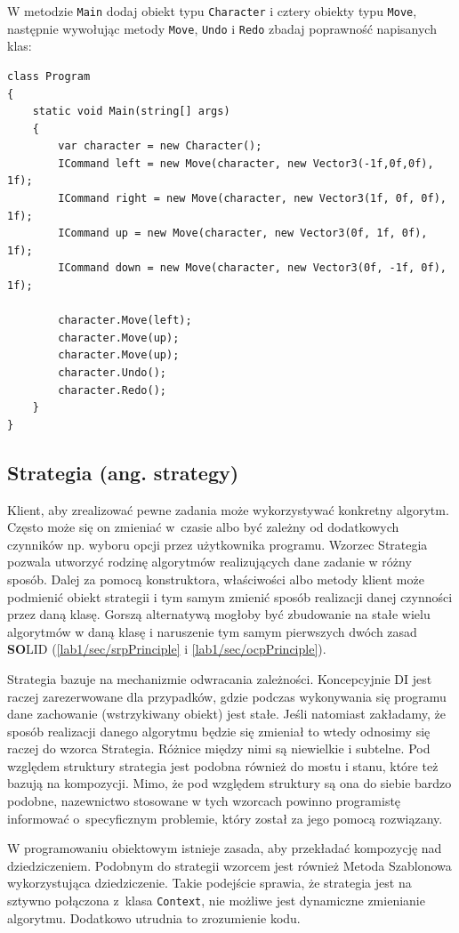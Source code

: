 W metodzie \texttt{Main} dodaj obiekt typu \texttt{Character} i cztery obiekty typu \texttt{Move}, następnie wywołując metody \texttt{Move}, \texttt{Undo} i \texttt{Redo} zbadaj poprawność napisanych klas:
\begin{lstlisting}
class Program
{
	static void Main(string[] args)
	{
		var character = new Character();
		ICommand left = new Move(character, new Vector3(-1f,0f,0f), 1f);
		ICommand right = new Move(character, new Vector3(1f, 0f, 0f), 1f);
		ICommand up = new Move(character, new Vector3(0f, 1f, 0f), 1f);
		ICommand down = new Move(character, new Vector3(0f, -1f, 0f), 1f);
		
		character.Move(left);
		character.Move(up);
		character.Move(up);
		character.Undo();
		character.Redo();
	}
}
\end{lstlisting}

\subsection{Strategia (ang. strategy)}

Klient, aby zrealizować pewne zadania może wykorzystywać konkretny algorytm. Często może się on zmieniać w~czasie albo być zależny od dodatkowych czynników np. wyboru opcji przez użytkownika programu. Wzorzec Strategia pozwala utworzyć rodzinę algorytmów realizujących dane zadanie w różny sposób. Dalej za pomocą konstruktora, właściwości albo metody klient może podmienić obiekt strategii i tym samym zmienić sposób realizacji danej czynności przez daną klasę. Gorszą alternatywą mogłoby być zbudowanie na stałe wielu algorytmów w daną klasę i naruszenie tym samym pierwszych dwóch zasad \textbf{SO}LID (\ref{lab1/sec/srpPrinciple} i \ref{lab1/sec/ocpPrinciple}).

Strategia bazuje na mechanizmie odwracania zależności. Koncepcyjnie DI jest raczej zarezerwowane dla przypadków, gdzie podczas wykonywania się programu dane zachowanie (wstrzykiwany obiekt) jest stałe. Jeśli natomiast zakładamy, że sposób realizacji danego algorytmu będzie się zmieniał to wtedy odnosimy się raczej do wzorca Strategia. Różnice między nimi są niewielkie i subtelne. Pod względem struktury strategia jest podobna również do mostu i stanu, które też bazują na kompozycji. Mimo, że pod względem struktury są ona do siebie bardzo podobne, nazewnictwo stosowane w tych wzorcach powinno programistę informować o~specyficznym problemie, który został za jego pomocą rozwiązany.

W programowaniu obiektowym istnieje zasada, aby przekładać kompozycję nad dziedziczeniem. Podobnym do strategii wzorcem jest również Metoda Szablonowa wykorzystująca dziedziczenie. Takie podejście sprawia, że strategia jest na sztywno połączona z~klasa \texttt{Context}, nie możliwe jest dynamiczne zmienianie algorytmu. Dodatkowo utrudnia to zrozumienie kodu. 

